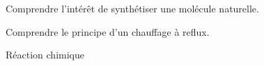 \sndEnTeteSix

\vspace*{-40pt}

\begin{objectifs}
  \item Comprendre l'intérêt de synthétiser une molécule naturelle.
  \item Comprendre le principe d'un chauffage à reflux.
\end{objectifs}

\begin{contexte}
  
  \problematique{
  }
\end{contexte}


\begin{doc}{Réaction chimique}
  \vspace*{-22pt}
  \begin{encart}

  \end{encart}

\end{doc}


